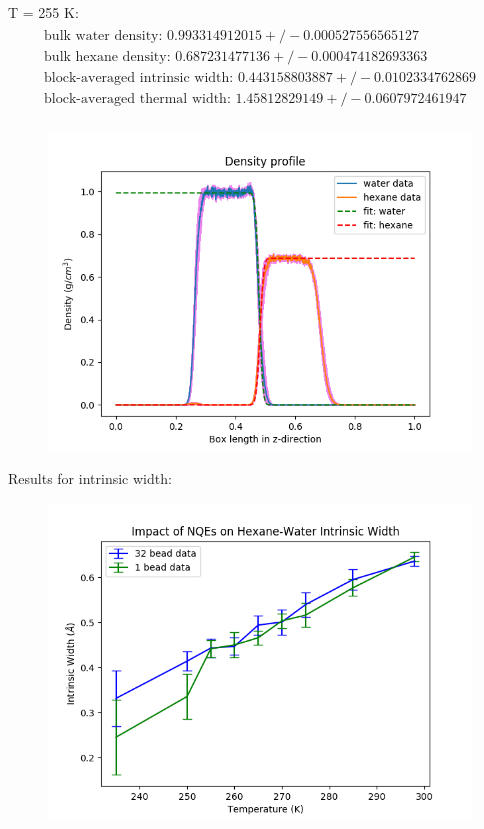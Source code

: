 \documentclass[12pt,reqno]{amsart}
\numberwithin{equation}{section}
\begin{document}
\begin{enumerate}
T = 255 K:
\begin{align}
\begin{split}
\text{bulk water density: } 0.993314912015  +/- 0.000527556565127 \\
\text{bulk hexane density: } 0.687231477136  +/- 0.000474182693363\\
\text{block-averaged intrinsic width: }  0.443158803887 +/- 0.0102334762869\\
\text{block-averaged thermal width: }  1.45812829149  +/- 0.0607972461947 \\
\end{split}
\end{align} 

\begin{figure}[H]
\centering
\includegraphics[scale=0.6]{interface_density_profile_full-255-32bead-combined}
\end{figure}

Results for intrinsic width:

\begin{figure}[H]
\centering
\includegraphics[scale=0.6]{intrinsic-width-32bead-vs-1bead-7-26-2018-lines}
\end{figure}


\end{enumerate}
\end{document}
